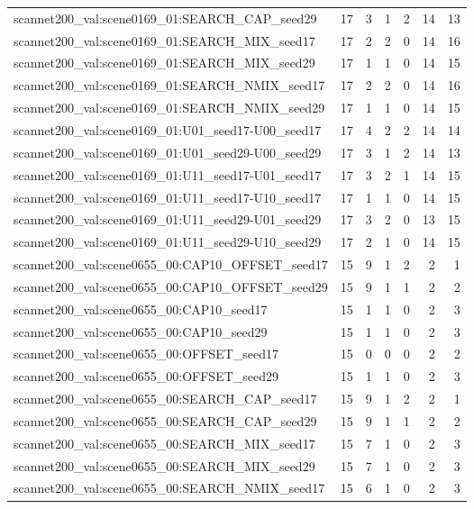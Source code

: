 \begin{table}[t]
\begin{tabular}{lrrrrrr}
scannet200\_val:scene0169\_01:SEARCH\_CAP\_seed29 & 17 & 3 & 1 & 2 & 14 & 13 \\
scannet200\_val:scene0169\_01:SEARCH\_MIX\_seed17 & 17 & 2 & 2 & 0 & 14 & 16 \\
scannet200\_val:scene0169\_01:SEARCH\_MIX\_seed29 & 17 & 1 & 1 & 0 & 14 & 15 \\
scannet200\_val:scene0169\_01:SEARCH\_NMIX\_seed17 & 17 & 2 & 2 & 0 & 14 & 16 \\
scannet200\_val:scene0169\_01:SEARCH\_NMIX\_seed29 & 17 & 1 & 1 & 0 & 14 & 15 \\
scannet200\_val:scene0169\_01:U01\_seed17-U00\_seed17 & 17 & 4 & 2 & 2 & 14 & 14 \\
scannet200\_val:scene0169\_01:U01\_seed29-U00\_seed29 & 17 & 3 & 1 & 2 & 14 & 13 \\
scannet200\_val:scene0169\_01:U11\_seed17-U01\_seed17 & 17 & 3 & 2 & 1 & 14 & 15 \\
scannet200\_val:scene0169\_01:U11\_seed17-U10\_seed17 & 17 & 1 & 1 & 0 & 14 & 15 \\
scannet200\_val:scene0169\_01:U11\_seed29-U01\_seed29 & 17 & 3 & 2 & 0 & 13 & 15 \\
scannet200\_val:scene0169\_01:U11\_seed29-U10\_seed29 & 17 & 2 & 1 & 0 & 14 & 15 \\
scannet200\_val:scene0655\_00:CAP10\_OFFSET\_seed17 & 15 & 9 & 1 & 2 & 2 & 1 \\
scannet200\_val:scene0655\_00:CAP10\_OFFSET\_seed29 & 15 & 9 & 1 & 1 & 2 & 2 \\
scannet200\_val:scene0655\_00:CAP10\_seed17 & 15 & 1 & 1 & 0 & 2 & 3 \\
scannet200\_val:scene0655\_00:CAP10\_seed29 & 15 & 1 & 1 & 0 & 2 & 3 \\
scannet200\_val:scene0655\_00:OFFSET\_seed17 & 15 & 0 & 0 & 0 & 2 & 2 \\
scannet200\_val:scene0655\_00:OFFSET\_seed29 & 15 & 1 & 1 & 0 & 2 & 3 \\
scannet200\_val:scene0655\_00:SEARCH\_CAP\_seed17 & 15 & 9 & 1 & 2 & 2 & 1 \\
scannet200\_val:scene0655\_00:SEARCH\_CAP\_seed29 & 15 & 9 & 1 & 1 & 2 & 2 \\
scannet200\_val:scene0655\_00:SEARCH\_MIX\_seed17 & 15 & 7 & 1 & 0 & 2 & 3 \\
scannet200\_val:scene0655\_00:SEARCH\_MIX\_seed29 & 15 & 7 & 1 & 0 & 2 & 3 \\
scannet200\_val:scene0655\_00:SEARCH\_NMIX\_seed17 & 15 & 6 & 1 & 0 & 2 & 3 \\

\end{tabular}
\end{table}
